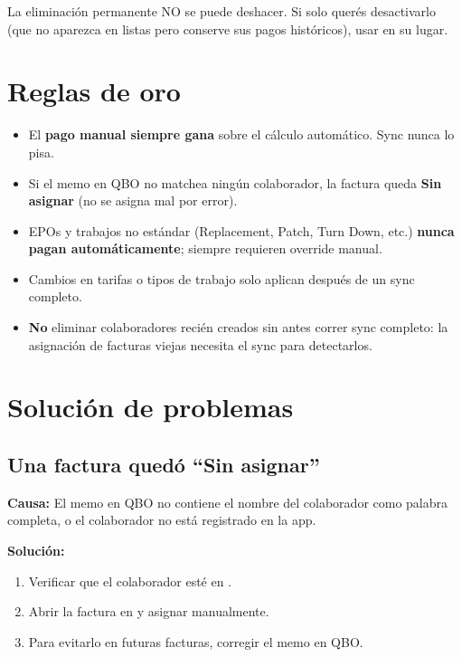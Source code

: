 \documentclass[11pt,a4paper]{article}
\begin{document}
\begin{dangerbox}
La eliminación permanente NO se puede deshacer. Si solo querés desactivarlo (que no aparezca en listas pero conserve sus pagos históricos), usar  en su lugar.
\end{dangerbox}

\section{Reglas de oro}

\begin{itemize}
  \item El \textbf{pago manual siempre gana} sobre el cálculo automático. Sync nunca lo pisa.
  \item Si el memo en QBO no matchea ningún colaborador, la factura queda \textbf{Sin asignar} (no se asigna mal por error).
  \item EPOs y trabajos no estándar (Replacement, Patch, Turn Down, etc.) \textbf{nunca pagan automáticamente}; siempre requieren override manual.
  \item Cambios en tarifas o tipos de trabajo solo aplican después de un sync completo.
  \item \textbf{No} eliminar colaboradores recién creados sin antes correr sync completo: la asignación de facturas viejas necesita el sync para detectarlos.
\end{itemize}

\section{Solución de problemas}

\subsection{Una factura quedó ``Sin asignar''}

\textbf{Causa:} El memo en QBO no contiene el nombre del colaborador como palabra completa, o el colaborador no está registrado en la app.

\textbf{Solución:}
\begin{enumerate}
  \item Verificar que el colaborador esté en .
  \item Abrir la factura en  y asignar manualmente.
  \item Para evitarlo en futuras facturas, corregir el memo en QBO.
\end{enumerate}
\end{document}

